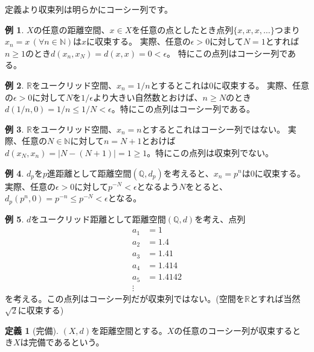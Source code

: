 \documentclass[uplatex]{jsarticle}
\newcommand{\Q}{\mathbb{Q}}
\newcommand{\R}{\mathbb{R}}
\theoremstyle{definition} %
\newtheorem{defi}[thm]{定義}
\newtheorem*{example*}{例}
\begin{document}
定義より収束列は明らかにコーシー列です。

\begin{example*}
$X$の任意の距離空間、$x \in X$を任意の点としたとき点列$\{x, x, x, \dots\}$つまり$x_n = x \,(\forall n \in \mathbb{N})$は$x$に収束する。
実際、任意の$\epsilon > 0$に対して$N = 1$とすれば$n \geq 1$のとき$d(x_n, x_N) = d(x, x) = 0 < \epsilon$。
特にこの点列はコーシー列である。
\end{example*}

\begin{example*}
$\R$をユークリッド空間、$x_n = 1/n$とするとこれは$0$に収束する。
実際、任意の$\epsilon > 0$に対して$N$を$1 / \epsilon$より大きい自然数とおけば、$n \geq N$のとき$d(1/n, 0) = 1/n \leq 1/N < \epsilon$。特にこの点列はコーシー列である。
\end{example*}

\begin{example*}
$\R$をユークリッド空間、$x_n = n$とするとこれはコーシー列ではない。
実際、任意の$N \in \mathbb{N}$に対して$n = N+1$とおけば$d(x_N, x_{n}) = |N - (N+1)| = 1 \geq 1$。特にこの点列は収束列でない。
\end{example*}

\begin{example*}
$d_p$を$p$進距離として距離空間$(\Q, d_p)$を考えると、$x_n = p^n$は$0$に収束する。
実際、任意の$\epsilon > 0$に対して$p^{-N} < \epsilon$となるよう$N$をとると、$d_p(p^n, 0) = p^{-n} \leq p^{-N} < \epsilon$となる。
\end{example*}

\begin{example*}
$d$をユークリッド距離として距離空間$(\Q, d)$を考え、点列
\begin{align*}
a_1 &= 1 \\
a_2 &= 1.4 \\
a_3 &= 1.41 \\
a_4 &= 1.414 \\
a_5 &= 1.4142 \\
\vdots
\end{align*}
を考える。この点列はコーシー列だが収束列ではない。(空間を$\R$とすれば当然$\sqrt 2$に収束する)
\end{example*}

\begin{oframed}\begin{defi}[完備]
$(X, d)$を距離空間とする。$X$の任意のコーシー列が収束するとき$X$は完備であるという。
\end{defi}\end{oframed}
\end{document}
